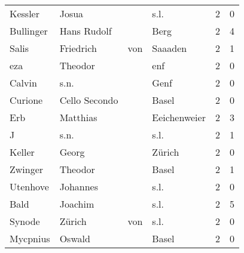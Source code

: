 \begin{center}
\begin{tiny}
\begin{longtabu}{llllrr}
                  Kessler &                              Josua &             &                                        s.l. &          2 &         0 \\
                Bullinger &                        Hans Rudolf &             &                                        Berg &          2 &         4 \\
                    Salis &                          Friedrich &         von &                                     Saaaden &          2 &         1 \\
                      eza &                            Theodor &             &                                         enf &          2 &         0 \\
                   Calvin &                               s.n. &             &                                        Genf &          2 &         0 \\
                  Curione &                      Cello Secondo &             &                                       Basel &          2 &         0 \\
                      Erb &                           Matthias &             &                                Eeichenweier &          2 &         3 \\
                        J &                               s.n. &             &                                        s.l. &          2 &         1 \\
                   Keller &                              Georg &             &                                      Zürich &          2 &         0 \\
                  Zwinger &                            Theodor &             &                                       Basel &          2 &         1 \\
                 Utenhove &                           Johannes &             &                                        s.l. &          2 &         0 \\
                     Bald &                            Joachim &             &                                        s.l. &          2 &         5 \\
                   Synode &                             Zürich &         von &                                        s.l. &          2 &         0 \\
                 Mycpnius &                             Oswald &             &                                       Basel &          2 &         0 \\

\end{longtabu}
\end{tiny}
\end{center}
